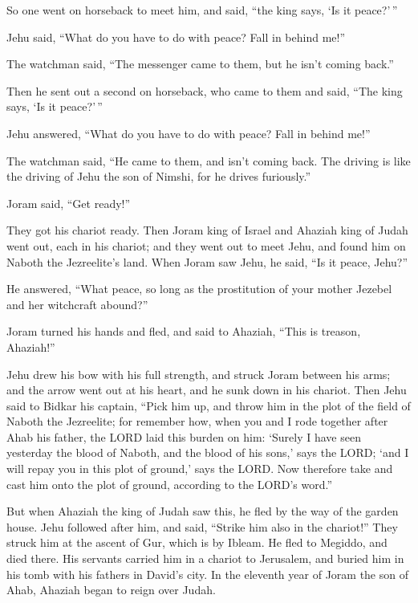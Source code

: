  So one went on horseback to meet him, and said, ``the king
says, `Is it peace?'\,''

Jehu said, ``What do you have to do with peace? Fall in behind me!''

The watchman said, ``The messenger came to them, but he isn't coming
back.''

 Then he sent out a second on horseback, who came to them
and said, ``The king says, `Is it peace?'\,''

Jehu answered, ``What do you have to do with peace? Fall in behind me!''

 The watchman said, ``He came to them, and isn't coming
back. The driving is like the driving of Jehu the son of Nimshi, for he
drives furiously.''

 Joram said, ``Get ready!''

They got his chariot ready. Then Joram king of Israel and Ahaziah king
of Judah went out, each in his chariot; and they went out to meet Jehu,
and found him on Naboth the Jezreelite's land.  When Joram
saw Jehu, he said, ``Is it peace, Jehu?''

He answered, ``What peace, so long as the prostitution of your mother
Jezebel and her witchcraft abound?''

 Joram turned his hands and fled, and said to Ahaziah,
``This is treason, Ahaziah!''

 Jehu drew his bow with his full strength, and struck Joram
between his arms; and the arrow went out at his heart, and he sunk down
in his chariot.  Then Jehu said to Bidkar his captain,
``Pick him up, and throw him in the plot of the field of Naboth the
Jezreelite; for remember how, when you and I rode together after Ahab
his father, the LORD laid this burden on him:  `Surely I
have seen yesterday the blood of Naboth, and the blood of his sons,'
says the LORD; `and I will repay you in this plot of ground,' says the
LORD. Now therefore take and cast him onto the plot of ground, according
to the LORD's word.''

 But when Ahaziah the king of Judah saw this, he fled by
the way of the garden house. Jehu followed after him, and said, ``Strike
him also in the chariot!'' They struck him at the ascent of Gur, which
is by Ibleam. He fled to Megiddo, and died there.  His
servants carried him in a chariot to Jerusalem, and buried him in his
tomb with his fathers in David's city.  In the eleventh
year of Joram the son of Ahab, Ahaziah began to reign over Judah.

